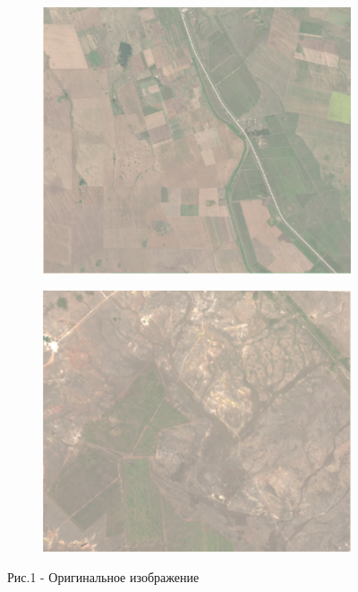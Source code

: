 \begin{figure}[H]
   \centering
   \begin{subfigure}{0.45\textwidth}
   	\centering
   	\includegraphics[width=\textwidth,height=0.75\textwidth]{media/ict/image31}
   \end{subfigure}
   \begin{subfigure}{0.45\textwidth}
   	\centering
   	\includegraphics[width=\textwidth,height=0.75\textwidth]{media/ict/image32}
   \end{subfigure}
   \caption*{Рис.1 - Оригинальное изображение}
\end{figure}

